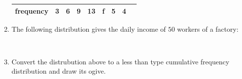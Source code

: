 \documentclass{article}
\begin{document}
\begin{enumerate}
\begin{table}[htb]
{\begin{tabular}{|c|c|c|c|c|c|c|c|c|}
                        \textbf{frequency} & 3 & 6 & 9 & 13 & f & 5 & 4 \\ \hline                                         \end{tabular}
                        }
                \end{table}
\item The following distribution gives the daily income of $50$ workers of a factory:
\begin{table}[htb]
	\end{table}\\
\item Convert the distrubution above to a less than type cumulative frequency distribution and draw its ogive.
	\end{enumerate}
	
\end{document}
